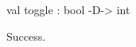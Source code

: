 \chklistingtrue
{}
\begin{ChkListingMsg}
val toggle : bool -D-> int
\end{ChkListingMsg}
\begin{ChkListingErr}
Success.
\end{ChkListingErr}
